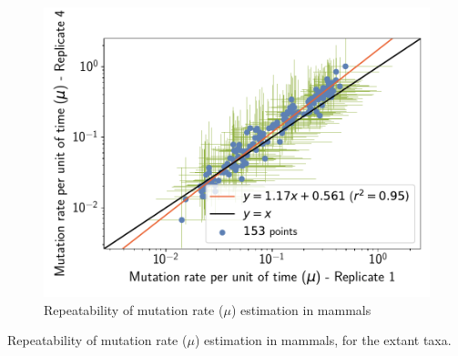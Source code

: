 \documentclass{article}
\begin{document}
\begin{figure}[H]
\begin{minipage}{0.32\linewidth}
			\includegraphics[width=\linewidth, page=1]{mammals/18CDS_SiteMutSelBranchNe_Rep_LogMutationRatePerTime-1-4}
		\end{minipage}
		\caption[Repeatability of mutation rate estimation in mammals]{Repeatability of mutation rate ($\mu$) estimation in mammals}
	\end{figure}

	\begin{table}[htbp]
		\renewcommand{\arraystretch}{0.5}
		\scriptsize \centering
		
		\caption[Repeatability of mutation rate estimation in mammals]{Repeatability of mutation rate ($\mu$) estimation in mammals, for the extant taxa.}
	\end{table}
\end{document}
